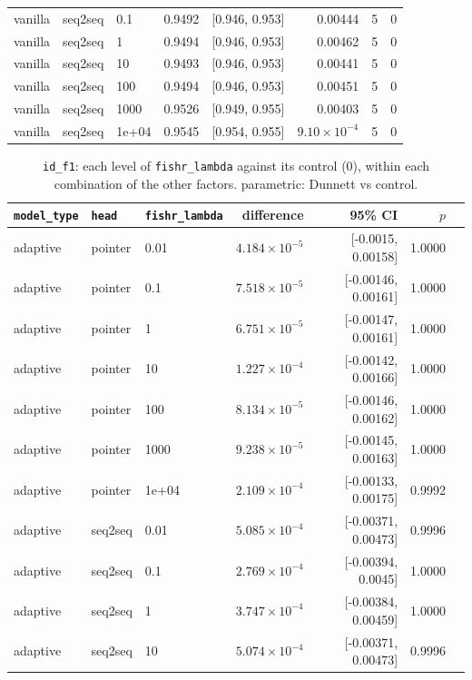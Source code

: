 \documentclass[10pt]{article}
\begin{document}
{\begin{longtable}{lllrlrrr}
vanilla & seq2seq & 0.1 & 0.9492 & [0.946, 0.953] & 0.00444 & 5 & 0\\
vanilla & seq2seq & 1 & 0.9494 & [0.946, 0.953] & 0.00462 & 5 & 0\\
vanilla & seq2seq & 10 & 0.9493 & [0.946, 0.953] & 0.00441 & 5 & 0\\
vanilla & seq2seq & 100 & 0.9494 & [0.946, 0.953] & 0.00451 & 5 & 0\\
vanilla & seq2seq & 1000 & 0.9526 & [0.949, 0.955] & 0.00403 & 5 & 0\\
vanilla & seq2seq & 1e+04 & 0.9545 & [0.954, 0.955] & $9.10\times10^{-4}$ & 5 & 0\\
\bottomrule
\end{longtable}
}

{\small
\begin{longtable}{lllrrrl}
\caption{\texttt{id\_f1}: each level of \texttt{fishr\_lambda} against its control (0), within each combination of the other factors. parametric: Dunnett vs control.}\label{tab:control-id_f1}\\
\toprule
\texttt{model\_type} & \texttt{head} & \texttt{fishr\_lambda} & difference & 95\% CI & $p$ & \\
\midrule
\endhead
adaptive & pointer & 0.01 & $4.184\times10^{-5}$ & [-0.0015, 0.00158] & 1.0000 & \\
adaptive & pointer & 0.1 & $7.518\times10^{-5}$ & [-0.00146, 0.00161] & 1.0000 & \\
adaptive & pointer & 1 & $6.751\times10^{-5}$ & [-0.00147, 0.00161] & 1.0000 & \\
adaptive & pointer & 10 & $1.227\times10^{-4}$ & [-0.00142, 0.00166] & 1.0000 & \\
adaptive & pointer & 100 & $8.134\times10^{-5}$ & [-0.00146, 0.00162] & 1.0000 & \\
adaptive & pointer & 1000 & $9.238\times10^{-5}$ & [-0.00145, 0.00163] & 1.0000 & \\
adaptive & pointer & 1e+04 & $2.109\times10^{-4}$ & [-0.00133, 0.00175] & 0.9992 & \\
adaptive & seq2seq & 0.01 & $5.085\times10^{-4}$ & [-0.00371, 0.00473] & 0.9996 & \\
adaptive & seq2seq & 0.1 & $2.769\times10^{-4}$ & [-0.00394, 0.0045] & 1.0000 & \\
adaptive & seq2seq & 1 & $3.747\times10^{-4}$ & [-0.00384, 0.00459] & 1.0000 & \\
adaptive & seq2seq & 10 & $5.074\times10^{-4}$ & [-0.00371, 0.00473] & 0.9996 & \\

\end{longtable}}
\end{document}
